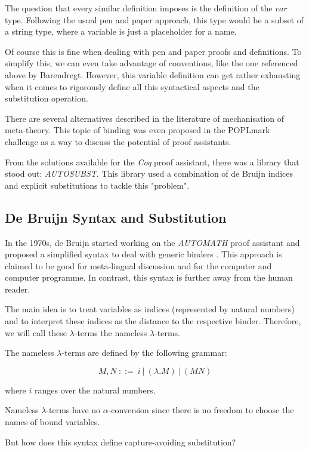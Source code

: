 The question that every similar definition imposes is the definition of the $var$ type. Following the usual pen and paper approach, this type would be a subset of a string type, where a variable is just a placeholder for a name.

Of course this is fine when dealing with pen and paper proofs and definitions. To simplify this, we can even take advantage of conventions, like the one referenced above by Barendregt. 
However, this variable definition can get rather exhausting  when it comes to rigorously define all this syntactical aspects and the substitution operation.

There are several alternatives described in the literature of mechanisation of meta-theory. 
This topic of binding was even proposed in the POPLmark challenge as a way to discuss the potential of proof assistants.

From the solutions available for the \textit{Coq} proof assistant, there was a library that stood out: \textit{AUTOSUBST}. 
This library used a combination of de Bruijn indices and explicit substitutions to tackle this "problem".


\subsection{De Bruijn Syntax and Substitution}

\cite{deBruijn} \cite{AutosubstSchafer}

In the 1970s, de Bruijn started working on the \textit{AUTOMATH} proof assistant and proposed a simplified syntax to deal with generic binders \cite{deBruijn}.
This approach is claimed to be good for meta-lingual discussion and for the computer and computer programme. In contrast, this syntax is further away from the human reader.

The main idea is to treat variables as indices (represented by natural numbers) and to interpret these indices as the distance to the respective binder.
Therefore, we will call these $\lambda$-terms the nameless $\lambda$-terms.

\begin{definition}
  The nameless $\lambda$-terms are defined by the following grammar:

  \[ M, N \ ::= \ i \ | \ (\lambda . M) \ | \ (M N) \]

  where $i$ ranges over the natural numbers.
\end{definition}

\begin{remark}
	Nameless $\lambda$-terms have no $\alpha$-conversion since there is no freedom to choose the names of bound variables.
\end{remark}

But how does this syntax define capture-avoiding substitution?


